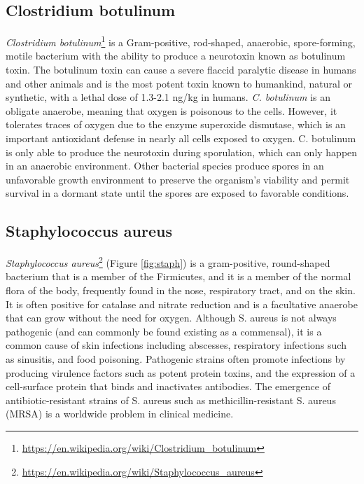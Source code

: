 \documentclass[]{book}
\let\rmarkdownfootnote\footnote%
\def\footnote{\protect\rmarkdownfootnote}
\renewcommand{\href}[2]{#2\footnote{\url{#1}}}
\begin{document}
\hypertarget{clostridium-botulinum}{%
\subsection{Clostridium botulinum}\label{clostridium-botulinum}}

\href{https://en.wikipedia.org/wiki/Clostridium_botulinum}{\emph{Clostridium botulinum}} is a Gram-positive, rod-shaped, anaerobic, spore-forming, motile bacterium with the ability to produce a neurotoxin known as botulinum toxin. The botulinum toxin can cause a severe flaccid paralytic disease in humans and other animals and is the most potent toxin known to humankind, natural or synthetic, with a lethal dose of 1.3-2.1 ng/kg in humans. \emph{C. botulinum} is an obligate anaerobe, meaning that oxygen is poisonous to the cells. However, it tolerates traces of oxygen due to the enzyme superoxide dismutase, which is an important antioxidant defense in nearly all cells exposed to oxygen. C. botulinum is only able to produce the neurotoxin during sporulation, which can only happen in an anaerobic environment. Other bacterial species produce spores in an unfavorable growth environment to preserve the organism's viability and permit survival in a dormant state until the spores are exposed to favorable conditions.

\hypertarget{staphylococcus-aureus}{%
\subsection{Staphylococcus aureus}\label{staphylococcus-aureus}}

\href{https://en.wikipedia.org/wiki/Staphylococcus_aureus}{\emph{Staphylococcus aureus}} (Figure \ref{fig:staph}) is a gram-positive, round-shaped bacterium that is a member of the Firmicutes, and it is a member of the normal flora of the body, frequently found in the nose, respiratory tract, and on the skin. It is often positive for catalase and nitrate reduction and is a facultative anaerobe that can grow without the need for oxygen. Although S. aureus is not always pathogenic (and can commonly be found existing as a commensal), it is a common cause of skin infections including abscesses, respiratory infections such as sinusitis, and food poisoning. Pathogenic strains often promote infections by producing virulence factors such as potent protein toxins, and the expression of a cell-surface protein that binds and inactivates antibodies. The emergence of antibiotic-resistant strains of S. aureus such as methicillin-resistant S. aureus (MRSA) is a worldwide problem in clinical medicine.
\end{document}
